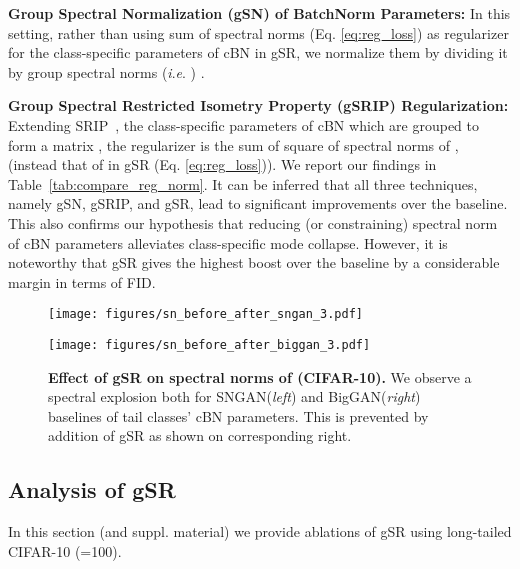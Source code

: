 \documentclass[runningheads,table]{llncs}
\newcommand{\ie}{\textit{i}.\textit{e}. }
\begin{document}
\noindent\textbf{Group Spectral Normalization (gSN) of BatchNorm Parameters:} In this setting, rather than using sum of spectral norms (Eq. \ref{eq:reg_loss}) as regularizer for the class-specific parameters of cBN in gSR, we normalize them by dividing it by group spectral norms (\ie ) \cite{miyato2018spectral}.



\noindent\textbf{Group Spectral Restricted Isometry Property (gSRIP) Regularization:}  Extending SRIP~\cite{bansal2018can}, the class-specific parameters of cBN which are grouped to form a matrix , the regularizer is the sum of square of spectral norms of , (instead that of  in gSR (Eq. \ref{eq:reg_loss})). We report our findings in Table~\ref{tab:compare_reg_norm}. It can be inferred that all three techniques, namely gSN, gSRIP, and gSR, lead to significant improvements over the baseline. This also confirms our hypothesis that reducing (or constraining) spectral norm of cBN parameters alleviates class-specific mode collapse. However, it is noteworthy that gSR gives the highest boost over the baseline by a considerable margin in terms of FID.


\begin{figure*}[t]
  \centering
  \begin{minipage}[t]{0.45\linewidth}
    \centering
    \texttt{[image: figures/sn\_before\_after\_sngan\_3.pdf]}
  \end{minipage}
  \begin{minipage}[t]{0.54\linewidth}
    \centering
    \texttt{[image: figures/sn\_before\_after\_biggan\_3.pdf]}
  \end{minipage}
    \caption{\textbf{Effect of gSR on spectral norms of  (CIFAR-10).} We observe a spectral explosion both for SNGAN(\textit{left}) and BigGAN(\textit{right}) baselines of tail classes' cBN parameters. This is prevented by addition of gSR as shown on corresponding right.}
  \label{fig:fid_sn}
\end{figure*}


\subsection{Analysis of gSR}
In this section (and suppl. material) we provide ablations of gSR using long-tailed CIFAR-10 (=100).  
\end{document}
